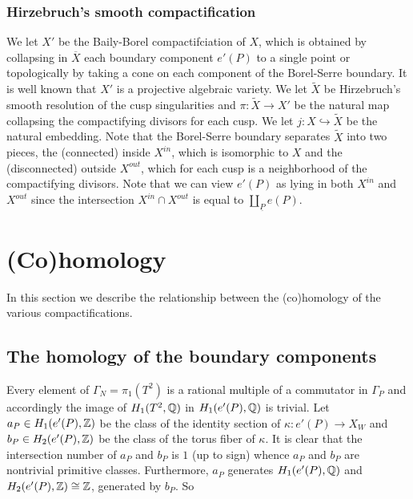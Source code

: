 \subsubsection{Hirzebruch's smooth compactification}\label{H-compact}

\vskip 0.3in 

We let $X'$ be the Baily-Borel compactifciation of $X$, which is
obtained by collapsing in $\overline{X}$ each boundary component
$e'(P)$ to a single point or topologically by taking a cone on each
component of the Borel-Serre boundary. It is well known that $X'$
is a projective algebraic variety. We let $\tilde{X}$ be Hirzebruch's
smooth resolution of the cusp singularities and $\pi:\tilde{X} \to
X'$ be the natural map collapsing the compactifying divisors for
each cusp. We let $j:X \hookrightarrow \tilde{X}$ be the natural
embedding. Note that the Borel-Serre boundary separates $\tilde{X}$
into two pieces, the (connected) inside $X^{in}$, which is isomorphic
to $X$ and the (disconnected) outside $X^{out}$, which for each
cusp is a neighborhood of the compactifying divisors. Note that we
can view $e'(P)$ as lying in both $X^{in}$ and $X^{out}$ since the
intersection $X^{in} \cap X^{out}$ is equal to $ \coprod_{\underline{P}}
e({P})$.


\vskip 0.3in 

\section{(Co)homology}

\vskip 0.3in 

In this section we describe the relationship between the (co)homology of the various
compactifications. 

\vskip 0.3in 

\subsection{The homology of the boundary components}\label{boundaryhom}

\vskip 0.3in 

Every element of $\Gamma_N =\pi_1(T^2)$ is a rational multiple of
a commutator in $\Gamma_P$ and accordingly the image of $H_1(T^2,\mathbb{Q})$
in $H_1(e'(P),\mathbb{Q})$ is trivial.
Let $a_P \in H_1(e'(P),\mathbb{Z})$ be the class of the identity section
of $\kappa:e'(P) \to X_W$ and $b_P \in H_2(e'(P),\mathbb{Z})$ be the class
of the torus fiber of $\kappa$. It is clear that the intersection
number of $a_P$ and $b_P$ is $1$ (up to sign) whence $a_P$ and $b_P$
are nontrivial primitive classes. Furthermore, $a_P$ generates
$H_1(e'(P),\mathbb{Q})$ and $ H_2(e'(P),\mathbb{Z})  \cong \mathbb{Z}$, generated by $b_P$.
So

